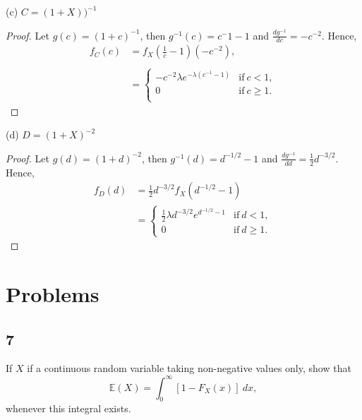 \documentclass{article}
\newcommand{\E}[1]{\mathbb{E}(#1)}
\newcommand{\deriv}[2]{\frac{d #1}{d#2}}
\begin{document}
(c) $C = (1 + X))^{-1}$
\begin{proof}
    Let $g(c) = (1 + c)^{-1}$, then $g^{-1}(c) = c^-1 - 1$ and
    $\deriv{g^{-1}}{c} = -c^{-2}$. Hence,
    \begin{align*}
        f_C(c) & = f_X(\frac{1}{c} - 1)(-c^{-2}),                                     \\                                              \\
               & = \begin{cases}
                       -c^{-2}\lambda e^{-\lambda(c^{-1} -1)} & \text{if} \ c < 1,    \\
                       0                                      & \text{if} \ c \geq 1. \\
                   \end{cases}
    \end{align*}
\end{proof}

(d) $D = (1 + X)^{-2}$
\begin{proof}
    Let $g(d) = (1 + d)^{-2}$, then $g^{-1} (d) = d^{-1/2} - 1$
    and $\deriv{g^{-1}}{d} = \frac{1}{2}d^{-3/2}$. Hence,
    \begin{align*}
        f_D(d) & = \frac{1}{2}d^{-3/2}f_X(d^{-1/2} - 1)                                                      \\
               & = \begin{cases}
                       \frac{1}{2}\lambda d^{-3/2} e^{d^{-1/2} - 1} & \text{if} \ d < 1,    \\
                       0                                            & \text{if} \ d \geq 1.
                   \end{cases}
    \end{align*}
\end{proof}

\section*{Problems}
\subsection*{7} %
If $X$ if a continuous random variable taking non-negative values only, show that
\begin{equation*}
    \E{X} = \int_0^\infty [1 - F_X(x)] \ dx,
\end{equation*}
whenever this integral exists.
\end{document}
